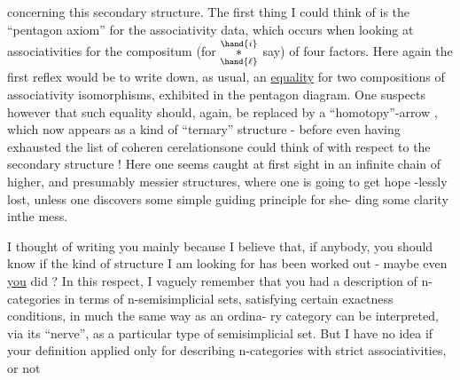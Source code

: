 

concerning this secondary structure. The first thing I could think of is
the ``pentagon axiom'' for the associativity data, which occurs when
 looking at associativities for the compositum (for $\overset{\hand{i}}{\underset{\hand{\ell}}{*}}$ say) of four factors.
Here again the first reflex would be to write down, as usual, an
\uline{equality} for  two compositions of associativity isomorphisms, exhibited
in the pentagon diagram. One suspects however that such equality should,
again, be replaced by a ``homotopy''-arrow , which now appears as a kind
of ``ternary'' structure - before even having exhausted the list of coheren%
cerelationsone could think of with respect to the secondary structure !
Here one seems caught at first sight in an infinite chain of 
higher, and presumably\hand{,} messier structures, where one is going to get hope%
-lessly lost, unless one discovers some simple guiding principle for she-%
ding some clarity in\hand{|}the mess.

  I thought of writing you mainly because I believe that, if anybody,
you should know if the kind of structure I am looking for has been worked
out - maybe even \uline{you} did ? In this respect, I vaguely remember that
you had a description of n-categories in terms of n-semisimplicial sets,
satisfying certain exactness conditions, in much the same way as an ordina-%
ry category can be interpreted, via its ``nerve'', as a particular type of
semisimplicial set. But I have no idea if your definition applied only
for describing n-categories with strict associativities, or not

